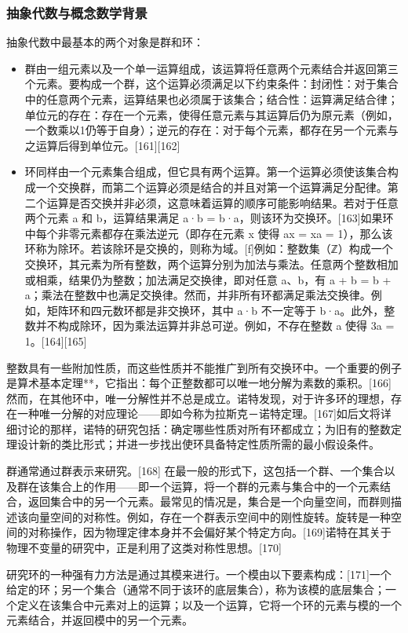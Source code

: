 \subsubsection{抽象代数与概念数学背景}
抽象代数中最基本的两个对象是群和环：
\begin{itemize}
\item 群由一组元素以及一个单一运算组成，该运算将任意两个元素结合并返回第三个元素。要构成一个群，这个运算必须满足以下约束条件：封闭性：对于集合中的任意两个元素，运算结果也必须属于该集合；结合性：运算满足结合律；单位元的存在：存在一个元素，使得任意元素与其运算后仍为原元素（例如，一个数乘以1仍等于自身）；逆元的存在：对于每个元素，都存在另一个元素与之运算后得到单位元。[161][162]
\item 环同样由一个元素集合组成，但它具有两个运算。第一个运算必须使该集合构成一个交换群，而第二个运算必须是结合的并且对第一个运算满足分配律。第二个运算是否交换并非必须，这意味着运算的顺序可能影响结果。若对于任意两个元素 a 和 b，运算结果满足 a·b = b·a，则该环为交换环。[163]如果环中每个非零元素都存在乘法逆元（即存在元素 x 使得 ax = xa = 1），那么该环称为除环。若该除环是交换的，则称为域。[f]例如：整数集（ℤ）构成一个交换环，其元素为所有整数，两个运算分别为加法与乘法。任意两个整数相加或相乘，结果仍为整数；加法满足交换律，即对任意 a、b，有 a + b = b + a；乘法在整数中也满足交换律。然而，并非所有环都满足乘法交换律。例如，矩阵环和四元数环都是非交换环，其中 a·b 不一定等于 b·a。此外，整数并不构成除环，因为乘法运算并非总可逆。例如，不存在整数 a 使得 3a = 1。[164][165]
\end{itemize}
整数具有一些附加性质，而这些性质并不能推广到所有交换环中。一个重要的例子是算术基本定理**，它指出：每个正整数都可以唯一地分解为素数的乘积。[166] 然而，在其他环中，唯一分解性并不总是成立。诺特发现，对于许多环的理想，存在一种唯一分解的对应理论——即如今称为拉斯克－诺特定理。[167]如后文将详细讨论的那样，诺特的研究包括：确定哪些性质对所有环都成立；为旧有的整数定理设计新的类比形式；并进一步找出使环具备特定性质所需的最小假设条件。

群通常通过群表示来研究。[168] 在最一般的形式下，这包括一个群、一个集合以及群在该集合上的作用——即一个运算，将一个群的元素与集合中的一个元素结合，返回集合中的另一个元素。最常见的情况是，集合是一个向量空间，而群则描述该向量空间的对称性。例如，存在一个群表示空间中的刚性旋转。旋转是一种空间的对称操作，因为物理定律本身并不会偏好某个特定方向。[169]诺特在其关于物理不变量的研究中，正是利用了这类对称性思想。[170]

研究环的一种强有力方法是通过其模来进行。一个模由以下要素构成：[171]一个给定的环；另一个集合（通常不同于该环的底层集合），称为该模的底层集合；一个定义在该集合中元素对上的运算；以及一个运算，它将一个环的元素与模的一个元素结合，并返回模中的另一个元素。


